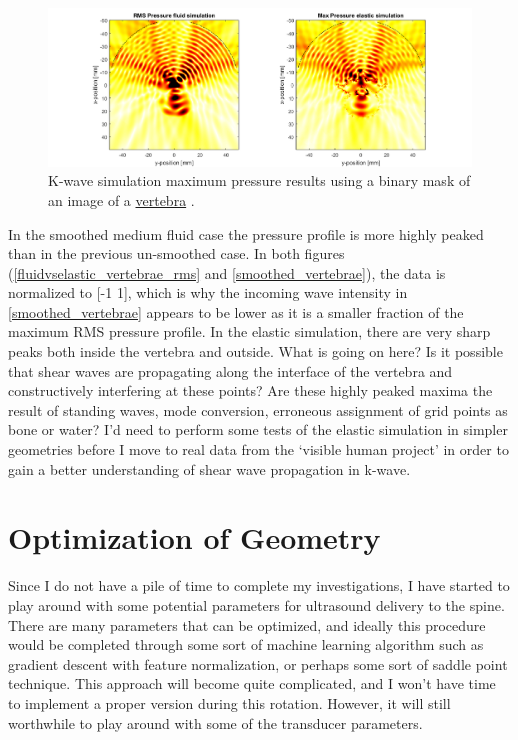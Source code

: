 \documentclass[10pt,a4paper]{article}
\begin{document}
\begin{figure}[H]
\hspace*{-4cm}
\includegraphics[scale=0.7]{max_p_smoothed_vert}
\caption{K-wave simulation maximum pressure results using a binary mask of an image of a \href{https://www.cedars-sinai.edu/Patients/Programs-and-Services/Spine-Center/The-Patient-Guide/Anatomy-of-the-Spine/Vertebrae-of-the-Spine.aspx}{vertebra} .}\label{max_p_smoothed_vert}
\end{figure} 


In the smoothed medium fluid case the pressure profile is more highly peaked than in the previous un-smoothed case. In both figures (\ref{fluidvselastic_vertebrae_rms} and \ref{smoothed_vertebrae}), the data is normalized to [-1 1], which is why the incoming wave intensity in \ref{smoothed_vertebrae} appears to be lower as it is a smaller fraction of the maximum RMS pressure profile. In the elastic simulation, there are very sharp peaks both inside the vertebra and outside. What is going on here? Is it possible that shear waves are propagating along the interface of the vertebra and constructively interfering at these points? Are these highly peaked maxima the result of standing waves, mode conversion, erroneous assignment of grid points as bone or water? I'd need to perform some tests of the elastic simulation in simpler geometries before I move to real data from the `visible human project' in order to gain a better understanding of shear wave propagation in k-wave. 

\section{Optimization of Geometry}

Since I do not have a pile of time to complete my investigations, I have started to play around with some potential parameters for ultrasound delivery to the spine. There are many parameters that can be optimized, and ideally this procedure would be completed through some sort of machine learning algorithm such as gradient descent with feature normalization, or perhaps some sort of saddle point technique. This approach will become quite complicated, and I won't have time to implement a proper version during this rotation. However, it will still worthwhile to play around with some of the transducer parameters. 
\end{document}

